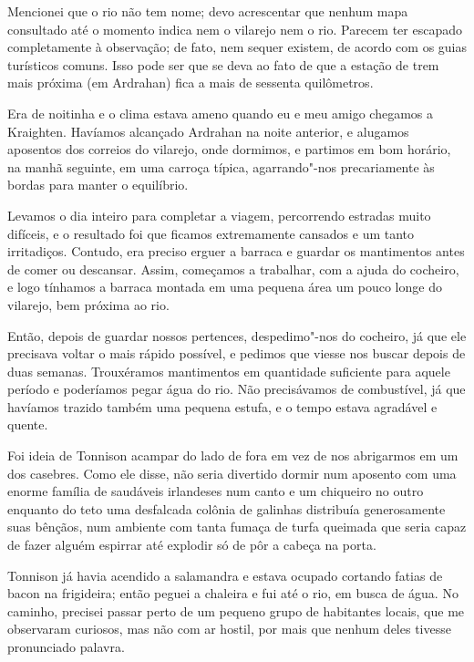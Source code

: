 Mencionei que o rio não tem nome; devo acrescentar que nenhum mapa consultado até o momento indica nem o vilarejo nem
o rio. Parecem ter escapado completamente à observação; de fato, nem sequer existem, de acordo com os guias
turísticos comuns. Isso pode ser que se deva ao fato de que a estação de trem mais próxima (em Ardrahan) fica a mais de
sessenta quilômetros.

Era de noitinha e o clima estava ameno quando eu e meu amigo chegamos a Kraighten. Havíamos alcançado Ardrahan na noite
anterior, e alugamos aposentos dos correios do vilarejo, onde dormimos, e partimos em bom horário, na manhã seguinte,
em uma carroça típica, agarrando"-nos precariamente às bordas para manter o equilíbrio.

Levamos o dia inteiro para completar a viagem, percorrendo estradas muito difíceis, e o resultado foi que ficamos
extremamente cansados e um tanto irritadiços. Contudo, era preciso erguer a barraca e guardar os mantimentos antes de
comer ou descansar. Assim, começamos a trabalhar, com a ajuda do cocheiro, e logo tínhamos a barraca montada em uma
pequena área um pouco longe do vilarejo, bem próxima ao rio.

Então, depois de guardar nossos pertences, despedimo"-nos do cocheiro, já que ele precisava voltar o mais rápido
possível, e pedimos que viesse nos buscar depois de duas semanas. Trouxéramos mantimentos em quantidade suficiente para
aquele período e poderíamos pegar água do rio. Não precisávamos de combustível, já que havíamos trazido também uma
pequena estufa, e o tempo estava agradável e quente.

Foi ideia de Tonnison acampar do lado de fora em vez de nos abrigarmos em um dos casebres. Como ele disse, não seria
divertido dormir num aposento com uma enorme família de saudáveis irlandeses num canto e um chiqueiro no outro enquanto
do teto uma desfalcada colônia de galinhas distribuía generosamente suas bênçãos, num ambiente com tanta fumaça de
turfa queimada que seria capaz de fazer alguém espirrar até explodir só de pôr a cabeça na porta.

Tonnison já havia acendido a salamandra e estava ocupado cortando fatias de bacon na frigideira; então peguei a chaleira
e fui até o rio, em busca de água. No caminho, precisei passar perto de um pequeno grupo de habitantes locais, que me
observaram curiosos, mas não com ar hostil, por mais que nenhum deles tivesse pronunciado palavra.

